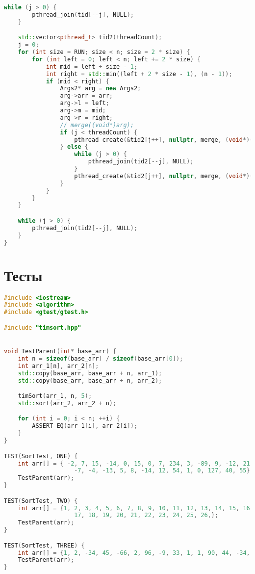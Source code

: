 \documentclass[a4paper, 12pt]{article}
\begin{document}
\begin{lstlisting}[language=C++]
    while (j > 0) {
        pthread_join(tid[--j], NULL);
    }

    std::vector<pthread_t> tid2(threadCount);
    j = 0;
    for (int size = RUN; size < n; size = 2 * size) {
        for (int left = 0; left < n; left += 2 * size) {
            int mid = left + size - 1;
            int right = std::min((left + 2 * size - 1), (n - 1));
            if (mid < right) {
                Args2* arg = new Args2;
                arg->arr = arr;
                arg->l = left;
                arg->m = mid;
                arg->r = right;
                // merge((void*)arg);
                if (j < threadCount) {
                    pthread_create(&tid2[j++], nullptr, merge, (void*)(arg));
                } else {
                    while (j > 0) {
                        pthread_join(tid2[--j], NULL);
                    }
                    pthread_create(&tid2[j++], nullptr, merge, (void*)(arg));
                }
            }
        }
    }

    while (j > 0) {
        pthread_join(tid2[--j], NULL);
    }
}    
\end{lstlisting}

\newpage
\section{Тесты}
\begin{lstlisting}[language=C++]
#include <iostream>
#include <algorithm>
#include <gtest/gtest.h>

#include "timsort.hpp"


void TestParent(int* base_arr) {
    int n = sizeof(base_arr) / sizeof(base_arr[0]);
    int arr_1[n], arr_2[n];
    std::copy(base_arr, base_arr + n, arr_1);
    std::copy(base_arr, base_arr + n, arr_2);

    timSort(arr_1, n, 5);
    std::sort(arr_2, arr_2 + n);

    for (int i = 0; i < n; ++i) {
        ASSERT_EQ(arr_1[i], arr_2[i]);
    }
}

TEST(SortTest, ONE) {
    int arr[] = { -2, 7, 15, -14, 0, 15, 0, 7, 234, 3, -89, 9, -12, 21,
                    -7, -4, -13, 5, 8, -14, 12, 54, 1, 0, 127, 40, 55};
    TestParent(arr);
}

TEST(SortTest, TWO) {
    int arr[] = {1, 2, 3, 4, 5, 6, 7, 8, 9, 10, 11, 12, 13, 14, 15, 16,
                    17, 18, 19, 20, 21, 22, 23, 24, 25, 26,};
    TestParent(arr);
}

TEST(SortTest, THREE) {
    int arr[] = {1, 2, -34, 45, -66, 2, 96, -9, 33, 1, 1, 90, 44, -34, -3, 4, 35, 0};
    TestParent(arr);
}
\end{lstlisting}
\end{document}
